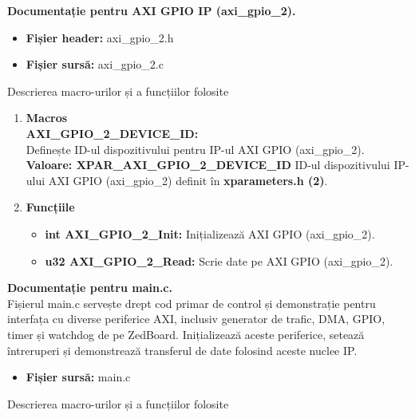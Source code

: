\documentclass[12pt]{article}
\begin{document}
\textbf{Documentație pentru AXI GPIO IP (axi\_gpio\_2).}
 \begin{itemize}
    \item \textbf{Fișier header:} axi\_gpio\_2.h
    \item \textbf{Fișier sursă:} axi\_gpio\_2.c\\
 \end{itemize}
\hspace*{1cm}Descrierea macro-urilor și a funcțiilor folosite
\begin{enumerate}
    \item \textbf{Macros}\\
    \hspace*{1cm} \textbf{AXI\_GPIO\_2\_DEVICE\_ID:} \\
    \hspace*{1cm} Definește ID-ul dispozitivului pentru IP-ul AXI GPIO (axi\_gpio\_2).\\
    \hspace*{1cm} \textbf{Valoare: XPAR\_AXI\_GPIO\_2\_DEVICE\_ID  } ID-ul dispozitivului IP-ului AXI GPIO (axi\_gpio\_2) definit în \textbf{xparameters.h (2)}.
    \item \textbf{Funcțiile}
        \begin{itemize}
            \item \textbf{int AXI\_GPIO\_2\_Init:} Inițializează AXI GPIO (axi\_gpio\_2).
            \item \textbf{u32 AXI\_GPIO\_2\_Read:} Scrie date pe AXI GPIO (axi\_gpio\_2).\\
        \end{itemize}
\end{enumerate}
\textbf{Documentație pentru main.c.}\\
\hspace*{1cm}Fișierul main.c servește drept cod primar de control și demonstrație pentru interfața cu diverse periferice AXI, inclusiv generator de trafic, DMA, GPIO, timer și watchdog de pe ZedBoard. Inițializează aceste periferice, setează întreruperi și demonstrează transferul de date folosind aceste nuclee IP.
 \begin{itemize}
    \item \textbf{Fișier sursă:} main.c\\
 \end{itemize}
\hspace*{1cm}Descrierea macro-urilor și a funcțiilor folosite
\end{document}
